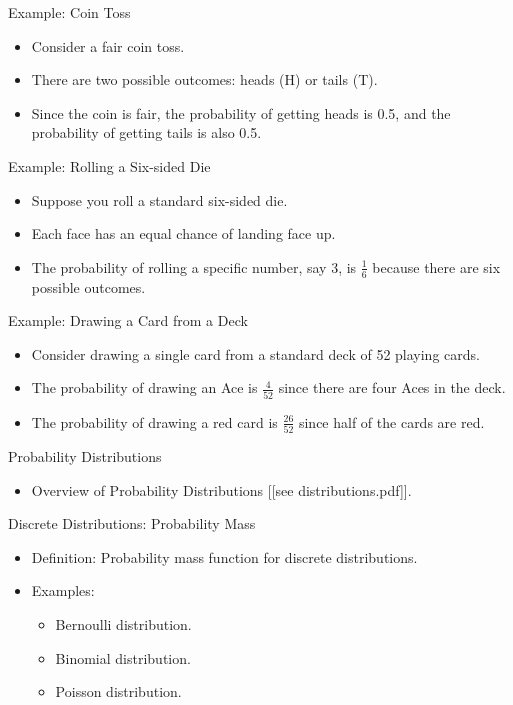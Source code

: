 \documentclass{beamer}
\begin{document}
\begin{frame}{Example: Coin Toss}
  \begin{itemize}
    \item Consider a fair coin toss.
    \item There are two possible outcomes: heads (H) or tails (T).
    \item Since the coin is fair, the probability of getting heads is 0.5, and the probability of getting tails is also 0.5.
  \end{itemize}
\end{frame}

\begin{frame}{Example: Rolling a Six-sided Die}
  \begin{itemize}
    \item Suppose you roll a standard six-sided die.
    \item Each face has an equal chance of landing face up.
    \item The probability of rolling a specific number, say 3, is \( \frac{1}{6} \) because there are six possible outcomes.
  \end{itemize}
\end{frame}

\begin{frame}{Example: Drawing a Card from a Deck}
  \begin{itemize}
    \item Consider drawing a single card from a standard deck of 52 playing cards.
    \item The probability of drawing an Ace is \( \frac{4}{52} \) since there are four Aces in the deck.
    \item The probability of drawing a red card is \( \frac{26}{52} \) since half of the cards are red.
  \end{itemize}
\end{frame}



\begin{frame}{Probability Distributions}
  \begin{itemize}
    \item Overview of Probability Distributions [[see distributions.pdf]].
  \end{itemize}
\end{frame}

\begin{frame}{Discrete Distributions: Probability Mass}
  \begin{itemize}
    \item Definition: Probability mass function for discrete distributions.
    \item Examples:
      \begin{itemize}
        \item Bernoulli distribution.
        \item Binomial distribution.
        \item Poisson distribution.
      \end{itemize}
  \end{itemize}
\end{frame}
\end{document}
